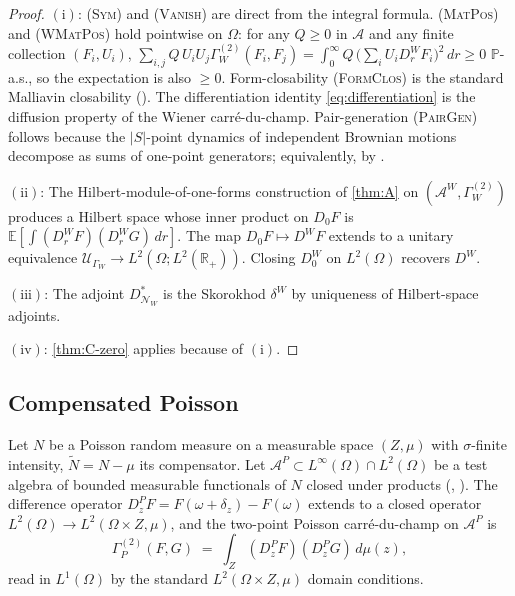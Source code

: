 \documentclass[11pt,reqno]{amsart}
\theoremstyle{plain}
\theoremstyle{definition}
\theoremstyle{remark}
\newcommand{\R}{\mathbb{R}}
\newcommand{\E}{\mathbb{E}}
\newcommand{\Prob}{\mathbb{P}}
\newcommand{\cA}{\mathcal A}
\newcommand{\cN}{\mathcal N}
\newcommand{\cU}{\mathcal U}
\begin{document}
\begin{proof}
$(\mathrm i)$: \textsc{(Sym)} and \textsc{(Vanish)} are direct
from the integral formula. \textsc{(MatPos)} and \textsc{(WMatPos)}
hold pointwise on $\Omega$: for any $Q\ge 0$ in $\cA$ and any
finite collection $(F_{i},U_{i})$,
$\sum_{i,j}Q\,U_{i}U_{j}\Gamma^{(2)}_{W}(F_{i},F_{j})
=\int_{0}^{\infty}Q\,\bigl(\sum_{i}U_{i}D_{r}^{W}F_{i}\bigr)^{2}\,dr\ge 0$
$\Prob$-a.s., so the expectation is also $\ge 0$.
Form-closability \textsc{(FormClos)} is the standard Malliavin
closability (\cite[Prop.~1.2.1]{Nualart}). The differentiation identity
\eqref{eq:differentiation} is the diffusion property of the
Wiener carr\'e-du-champ. Pair-generation
\textsc{(PairGen)} follows because the $|S|$-point dynamics of
independent Brownian motions decompose as sums of one-point
generators; equivalently, by
\cite[Prop.~6.4]{PrimitiveDivergence}.

$(\mathrm{ii})$: The Hilbert-module-of-one-forms construction
of \cref{thm:A} on $(\cA^{W},\Gamma^{(2)}_{W})$ produces a
Hilbert space whose inner product on $D_{0}F$ is
$\E[\int(D_{r}^{W}F)(D_{r}^{W}G)\,dr]$.
The map $D_{0}F\mapsto D^{W}F$ extends to a unitary equivalence
$\cU_{\Gamma_{W}}\to L^{2}(\Omega;L^{2}(\R_{+}))$. Closing
$D_{0}^{W}$ on $L^{2}(\Omega)$ recovers $D^{W}$.

$(\mathrm{iii})$: The adjoint $D_{\cN_{W}}^{*}$ is the
Skorokhod $\delta^{W}$ by uniqueness of Hilbert-space adjoints.

$(\mathrm{iv})$: \cref{thm:C-zero} applies because of $(\mathrm i)$.
\end{proof}

\subsection{Compensated Poisson}\label{sec:bench-poisson}

Let $N$ be a Poisson random measure on a measurable space
$(Z,\mu)$ with $\sigma$-finite intensity, $\widetilde N=N-\mu$
its compensator. Let $\cA^{P}\subset L^{\infty}(\Omega)\cap L^{2}(\Omega)$
be a test algebra of bounded measurable functionals of $N$
closed under products (\cite[Ch.~6]{Nualart},
\cite[Ch.~18]{LastPenrose}). The difference operator
$D^{P}_{z}F=F(\omega+\delta_{z})-F(\omega)$ extends to a closed
operator $L^{2}(\Omega)\to L^{2}(\Omega\times Z,\mu)$, and the
two-point Poisson carr\'e-du-champ on $\cA^{P}$ is
\[
  \Gamma^{(2)}_{P}(F,G)
  \;=\;\int_{Z}(D^{P}_{z}F)(D^{P}_{z}G)\,d\mu(z),
\]
read in $L^{1}(\Omega)$ by the standard $L^{2}(\Omega\times Z,\mu)$
domain conditions.
\end{document}
